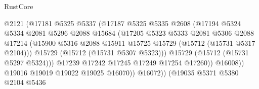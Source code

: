 \begin{lexlean}{RustCore}
\begin{coremodule}
                                        @2121
                                        (@17181
                                          @5325
                                          @5337
                                          (@17187
                                            @5325
                                            @5335
                                            @2608
                                            (@17194
                                              @5324
                                              @5334
                                              @2081
                                              @5296
                                              @2088
                                              @15684
                                              (@17205
                                                @5323
                                                @5333
                                                @2081
                                                @5306
                                                @2088
                                                @17214
                                                (@15900
                                                  @5316
                                                  @2088
                                                  @15911
                                                  @15725
                                                  @15729
                                                  (@15712 (@15731 @5317 @2104)))
                                                @15729
                                                (@15712 (@15731 @5307 @5323)))
                                              @15729
                                              (@15712 (@15731 @5297 @5324)))
                                            @17239
                                            @17242
                                            @17245
                                            @17249
                                            @17254
                                            @17260))
                                        @16008))
                                    @19016
                                    @19019
                                    @19022
                                    @19025
                                    @16070))
                                @16072))
                            (@19035
                              @5371
                              @5380
                              @2104
                              @5436

\end{coremodule}
\end{lexlean}

